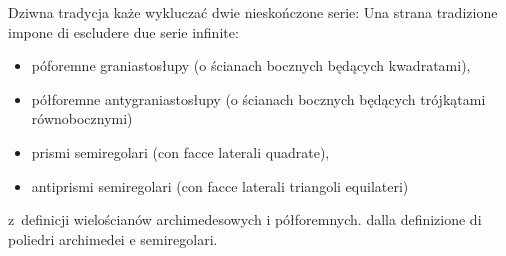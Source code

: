 Dziwna tradycja każe wykluczać dwie nieskończone serie: %
Una strana tradizione impone di escludere due serie infinite: %
\label{dwie_serie}%
\begin{itemize}
\item póforemne graniastosłupy (o ścianach bocznych będących kwadratami), %
\item półforemne antygraniastosłupy (o ścianach bocznych będących trójkątami równobocznymi) %
\item prismi semiregolari (con facce laterali quadrate), %
\item antiprismi semiregolari (con facce laterali triangoli equilateri) %
\end{itemize}
z~definicji wielościanów archimedesowych i półforemnych. %
dalla definizione di poliedri archimedei e semiregolari. %

%